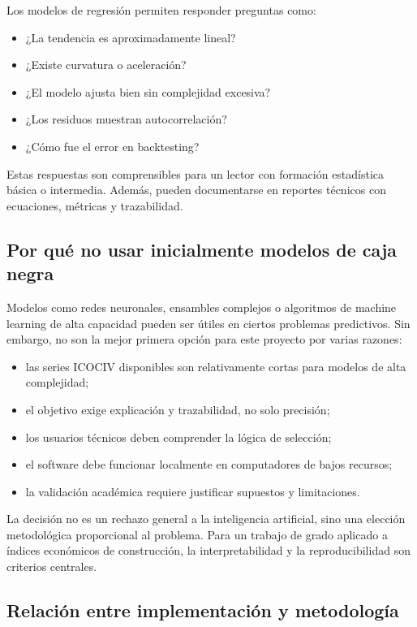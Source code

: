 Los modelos de regresión permiten responder preguntas como:

\begin{itemize}
    \item ¿La tendencia es aproximadamente lineal?
    \item ¿Existe curvatura o aceleración?
    \item ¿El modelo ajusta bien sin complejidad excesiva?
    \item ¿Los residuos muestran autocorrelación?
    \item ¿Cómo fue el error en backtesting?
\end{itemize}

Estas respuestas son comprensibles para un lector con formación estadística básica o intermedia. Además, pueden documentarse en reportes técnicos con ecuaciones, métricas y trazabilidad.

\subsection{Por qué no usar inicialmente modelos de caja negra}

Modelos como redes neuronales, ensambles complejos o algoritmos de machine learning de alta capacidad pueden ser útiles en ciertos problemas predictivos. Sin embargo, no son la mejor primera opción para este proyecto por varias razones:

\begin{itemize}
    \item las series ICOCIV disponibles son relativamente cortas para modelos de alta complejidad;
    \item el objetivo exige explicación y trazabilidad, no solo precisión;
    \item los usuarios técnicos deben comprender la lógica de selección;
    \item el software debe funcionar localmente en computadores de bajos recursos;
    \item la validación académica requiere justificar supuestos y limitaciones.
\end{itemize}

La decisión no es un rechazo general a la inteligencia artificial, sino una elección metodológica proporcional al problema. Para un trabajo de grado aplicado a índices económicos de construcción, la interpretabilidad y la reproducibilidad son criterios centrales.

\subsection{Relación entre implementación y metodología}

